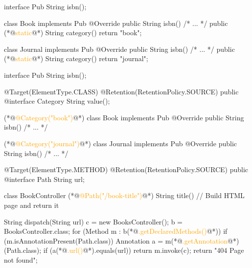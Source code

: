 \documentclass{article}
\begin{document}

\begin{pptWide}{2}
{\scriptsize\begin{ffcode}
interface Pub
  String isbn();

class Book implements Pub
  @Override public String isbn()
    /* ... */
  public (*@\textcolor{orange}{static}@*) String category()
    return "book";

class Journal implements Pub
  @Override public String isbn()
    /* ... */
  public (*@\textcolor{orange}{static}@*) String category()
    return "journal";
\end{ffcode}
}
\par\columnbreak\par
{\scriptsize\begin{ffcode}
interface Pub
  String isbn();

@Target(ElementType.CLASS)
@Retention(RetentionPolicy.SOURCE)
public @interface Category
  String value();

(*@\textcolor{orange}{@Category("book")}@*)
class Book implements Pub
  @Override public String isbn()
    /* ... */

(*@\textcolor{orange}{@Category("journal")}@*)
class Journal implements Pub
  @Override public String isbn()
    /* ... */
\end{ffcode}
}
\end{pptWide}
\par
\plush{}

\begin{pptWide}{2}
{\small\begin{ffcode}
@Target(ElementType.METHOD)
@Retention(RetentionPolicy.SOURCE)
public @interface Path
  String url;

class BookController
  (*@\textcolor{orange}{@Path("/book-title")}@*)
  String title()
    // Build HTML page and return it
\end{ffcode}
}
\par\columnbreak\par
{\scriptsize\begin{ffcode}
String dispatch(String url) {
  c = new BooksController();
  b = BooksController.class;
  for (Method m : b(*@\textcolor{orange}{.getDeclaredMethods()}@*)) {
    if (m.isAnnotationPresent(Path.class)) {
      Annotation a = m(*@\textcolor{orange}{.getAnnotation}@*)(Path.class);
      if (a(*@\textcolor{orange}{.url()}@*).equals(url)) {
        return m.invoke(c);
      }
    }
  }
  return "404 Page not found";
}
\end{ffcode}
}
\end{pptWide}
\par
\plush{}
\end{document}
